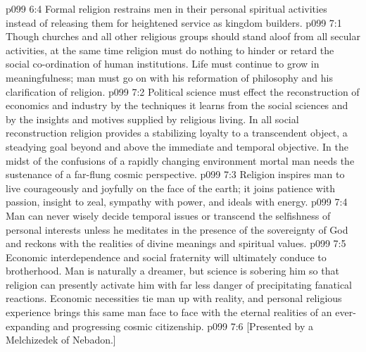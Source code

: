 \vs p099 6:4 Formal religion restrains men in their personal spiritual activities instead of releasing them for heightened service as kingdom builders.
\vs p099 7:1 Though churches and all other religious groups should stand aloof from all secular activities, at the same time religion must do nothing to hinder or retard the social co\hyp{}ordination of human institutions. Life must continue to grow in meaningfulness; man must go on with his reformation of philosophy and his clarification of religion.
\vs p099 7:2 Political science must effect the reconstruction of economics and industry by the techniques it learns from the social sciences and by the insights and motives supplied by religious living. In all social reconstruction religion provides a stabilizing loyalty to a transcendent object, a steadying goal beyond and above the immediate and temporal objective. In the midst of the confusions of a rapidly changing environment mortal man needs the sustenance of a far\hyp{}flung cosmic perspective.
\vs p099 7:3 Religion inspires man to live courageously and joyfully on the face of the earth; it joins patience with passion, insight to zeal, sympathy with power, and ideals with energy.
\vs p099 7:4 Man can never wisely decide temporal issues or transcend the selfishness of personal interests unless he meditates in the presence of the sovereignty of God and reckons with the realities of divine meanings and spiritual values.
\vs p099 7:5 Economic interdependence and social fraternity will ultimately conduce to brotherhood. Man is naturally a dreamer, but science is sobering him so that religion can presently activate him with far less danger of precipitating fanatical reactions. Economic necessities tie man up with reality, and personal religious experience brings this same man face to face with the eternal realities of an ever\hyp{}expanding and progressing cosmic citizenship.
\vsetoff
\vs p099 7:6 [Presented by a Melchizedek of Nebadon.]
\quizlink

